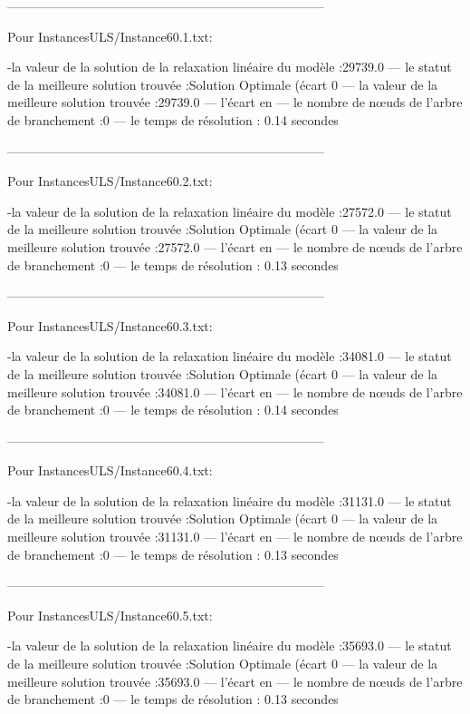 ---------------------------------------------------------------------------

Pour InstancesULS/Instance60.1.txt:


-la valeur de la solution de la relaxation linéaire du modèle :29739.0
— le statut de la meilleure solution trouvée :Solution Optimale (écart 0%
— la valeur de la meilleure solution trouvée :29739.0
— l’écart en %
— le nombre de nœuds de l’arbre de branchement :0
— le temps de résolution : 0.14 secondes



---------------------------------------------------------------------------

Pour InstancesULS/Instance60.2.txt:


-la valeur de la solution de la relaxation linéaire du modèle :27572.0
— le statut de la meilleure solution trouvée :Solution Optimale (écart 0%
— la valeur de la meilleure solution trouvée :27572.0
— l’écart en %
— le nombre de nœuds de l’arbre de branchement :0
— le temps de résolution : 0.13 secondes


---------------------------------------------------------------------------

Pour InstancesULS/Instance60.3.txt:


-la valeur de la solution de la relaxation linéaire du modèle :34081.0
— le statut de la meilleure solution trouvée :Solution Optimale (écart 0%
— la valeur de la meilleure solution trouvée :34081.0
— l’écart en %
— le nombre de nœuds de l’arbre de branchement :0
— le temps de résolution : 0.14 secondes



---------------------------------------------------------------------------

Pour InstancesULS/Instance60.4.txt:


-la valeur de la solution de la relaxation linéaire du modèle :31131.0
— le statut de la meilleure solution trouvée :Solution Optimale (écart 0%
— la valeur de la meilleure solution trouvée :31131.0
— l’écart en %
— le nombre de nœuds de l’arbre de branchement :0
— le temps de résolution : 0.13 secondes


---------------------------------------------------------------------------

Pour InstancesULS/Instance60.5.txt:


-la valeur de la solution de la relaxation linéaire du modèle :35693.0
— le statut de la meilleure solution trouvée :Solution Optimale (écart 0%
— la valeur de la meilleure solution trouvée :35693.0
— l’écart en %
— le nombre de nœuds de l’arbre de branchement :0
— le temps de résolution : 0.13 secondes


